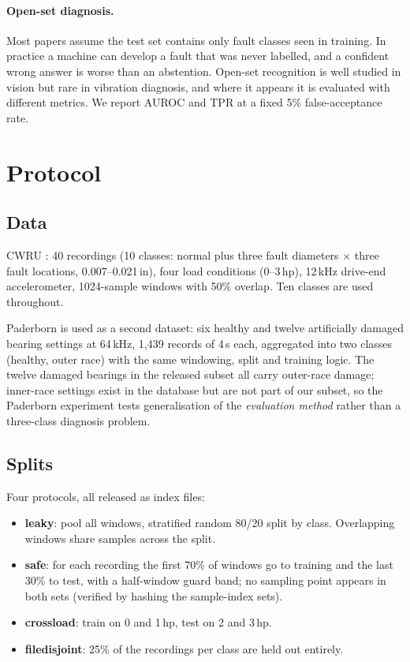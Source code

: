 \documentclass[11pt,a4paper]{article}
\begin{document}
\paragraph{Open-set diagnosis.} Most papers assume the test set contains only fault classes seen in training. In practice a machine can develop a fault that was never labelled, and a confident wrong answer is worse than an abstention. Open-set recognition is well studied in vision but rare in vibration diagnosis, and where it appears it is evaluated with different metrics. We report AUROC and TPR at a fixed 5\% false-acceptance rate.

\section{Protocol}

\subsection{Data}
CWRU \citep{smith2015cwru}: 40 recordings (10 classes: normal plus three fault diameters $\times$ three fault locations, 0.007--0.021\,in), four load conditions (0--3\,hp), 12\,kHz drive-end accelerometer, 1024-sample windows with 50\% overlap. Ten classes are used throughout.

Paderborn \citep{lessmeier2016paderborn} is used as a second dataset: six healthy and twelve artificially damaged bearing settings at 64\,kHz, 1{,}439 records of 4\,s each, aggregated into two classes (healthy, outer race) with the same windowing, split and training logic. The twelve damaged bearings in the released subset all carry outer-race damage; inner-race settings exist in the database but are not part of our subset, so the Paderborn experiment tests generalisation of the \emph{evaluation method} rather than a three-class diagnosis problem.

\subsection{Splits}
Four protocols, all released as index files:
\begin{itemize}
\item \textbf{leaky}: pool all windows, stratified random 80/20 split by class. Overlapping windows share samples across the split.
\item \textbf{safe}: for each recording the first 70\% of windows go to training and the last 30\% to test, with a half-window guard band; no sampling point appears in both sets (verified by hashing the sample-index sets).
\item \textbf{crossload}: train on 0 and 1\,hp, test on 2 and 3\,hp.
\item \textbf{filedisjoint}: 25\% of the recordings per class are held out entirely.
\end{itemize}
\end{document}
